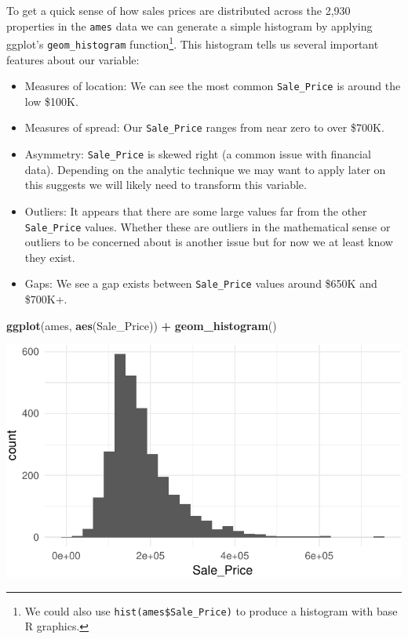\documentclass[]{article}
\newenvironment{Shaded}{\begin{snugshade}}{\end{snugshade}}
\newcommand{\KeywordTok}[1]{\textcolor[rgb]{0.13,0.29,0.53}{\textbf{#1}}}
\newcommand{\StringTok}[1]{\textcolor[rgb]{0.31,0.60,0.02}{#1}}
\newcommand{\OperatorTok}[1]{\textcolor[rgb]{0.81,0.36,0.00}{\textbf{#1}}}
\newcommand{\NormalTok}[1]{#1}
\providecommand{\tightlist}{%
  \setlength{\itemsep}{0pt}\setlength{\parskip}{0pt}}
\let\rmarkdownfootnote\footnote%
\def\footnote{\protect\rmarkdownfootnote}
\begin{document}
To get a quick sense of how sales prices are distributed across the
2,930 properties in the \texttt{ames} data we can generate a simple
histogram by applying ggplot's \texttt{geom\_histogram}
function\footnote{We could also use \texttt{hist(ames\$Sale\_Price)} to
  produce a histogram with base R graphics.}. This histogram tells us
several important features about our variable:

\begin{itemize}
\tightlist
\item
  Measures of location: We can see the most common \texttt{Sale\_Price}
  is around the low \$100K.
\item
  Measures of spread: Our \texttt{Sale\_Price} ranges from near zero to
  over \$700K.
\item
  Asymmetry: \texttt{Sale\_Price} is skewed right (a common issue with
  financial data). Depending on the analytic technique we may want to
  apply later on this suggests we will likely need to transform this
  variable.
\item
  Outliers: It appears that there are some large values far from the
  other \texttt{Sale\_Price} values. Whether these are outliers in the
  mathematical sense or outliers to be concerned about is another issue
  but for now we at least know they exist.
\item
  Gaps: We see a gap exists between \texttt{Sale\_Price} values around
  \$650K and \$700K+.
\end{itemize}

\begin{Shaded}
\begin{Highlighting}[]
\KeywordTok{ggplot}\NormalTok{(ames, }\KeywordTok{aes}\NormalTok{(Sale_Price)) }\OperatorTok{+}
\StringTok{  }\KeywordTok{geom_histogram}\NormalTok{()}
\end{Highlighting}
\end{Shaded}

\begin{center}\includegraphics{Chapter_3_-_Visualization_files/figure-latex/hist1-1} \end{center}
\end{document}

